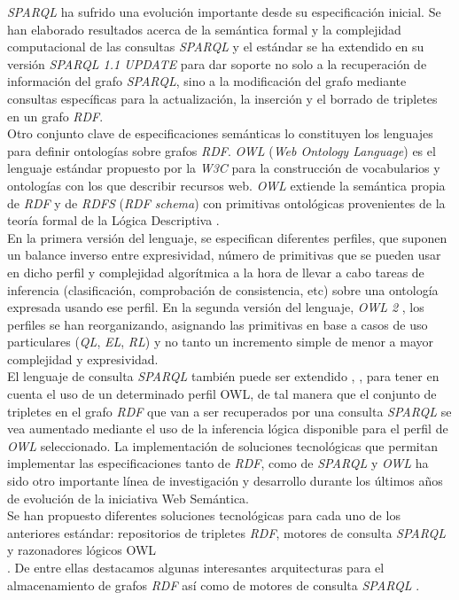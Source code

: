 \textit{SPARQL} ha sufrido una evoluci\'on importante desde su especificaci\'on inicial. Se han elaborado resultados acerca de la sem\'antica formal y la complejidad computacional de las consultas \textit{SPARQL} \cite{perez2006semantics} y el est\'andar se ha extendido en su versi\'on \textit{SPARQL 1.1 UPDATE} \cite{sparql11} para dar soporte no solo a la recuperaci\'on de informaci\'on del grafo \textit{SPARQL}, sino a la modificaci\'on del grafo mediante consultas espec\'ificas para la actualizaci\'on, la inserci\'on y el borrado de tripletes en un grafo \textit{RDF}.\\
Otro conjunto clave de especificaciones sem\'anticas lo constituyen los lenguajes para definir ontolog\'ias sobre grafos \textit{RDF}. \textit{OWL} (\textit{Web Ontology Language}) \cite{owl} es el lenguaje est\'andar propuesto por la \textit{W3C} para la construcci\'on de vocabularios y ontolog\'ias con los que describir recursos web. \textit{OWL} extiende la sem\'antica propia de \textit{RDF} y de \textit{RDFS} (\textit{RDF schema}) \cite{rdfs} con primitivas ontol\'ogicas provenientes de la teor\'ia formal de la L\'ogica Descriptiva \cite{owl_dl_reduction}.\\
En la primera versi\'on del lenguaje, se especifican diferentes perfiles, que suponen un balance inverso entre expresividad, n\'umero de primitivas que se pueden usar en dicho perfil y complejidad algor\'itmica a la hora de llevar a cabo tareas de inferencia (clasificaci\'on, comprobaci\'on de consistencia, etc) sobre una ontolog\'ia expresada usando ese perfil. En la segunda versi\'on del lenguaje, \textit{OWL 2} \cite{owl2}, los perfiles se han reorganizando, asignando las primitivas en base a casos de uso particulares (\textit{QL}, \textit{EL}, \textit{RL}) \cite{owl2_profiles} y no tanto un incremento simple de menor a mayor complejidad y expresividad.\\
El lenguaje de consulta \textit{SPARQL} tambi\'en puede ser extendido \cite{sirin2007sparql}, \cite{glimm2009sparql}, para tener en cuenta el uso de un determinado perfil OWL, de tal manera que el conjunto de tripletes en el grafo \textit{RDF} que van a ser recuperados por una consulta \textit{SPARQL} se vea aumentado mediante el uso de la inferencia l\'ogica disponible para el perfil de \textit{OWL} seleccionado.
La implementaci\'on de soluciones tecnol\'ogicas que permitan implementar las especificaciones tanto de \textit{RDF}, como de \textit{SPARQL} y \textit{OWL} ha sido otro importante l\'inea de investigaci\'on y desarrollo durante los \'ultimos a\~nos de evoluci\'on de la iniciativa Web Sem\'antica.\\
Se han propuesto diferentes soluciones tecnol\'ogicas para cada uno de los anteriores est\'andar: repositorios de tripletes \textit{RDF}, motores de consulta \textit{SPARQL} y razonadores l\'ogicos OWL\\. 
De entre ellas destacamos algunas interesantes arquitecturas para el almacenamiento de grafos \textit{RDF} as\'i como de motores de consulta \textit{SPARQL} \cite{yars} \cite{rohloff2010high}.\\

